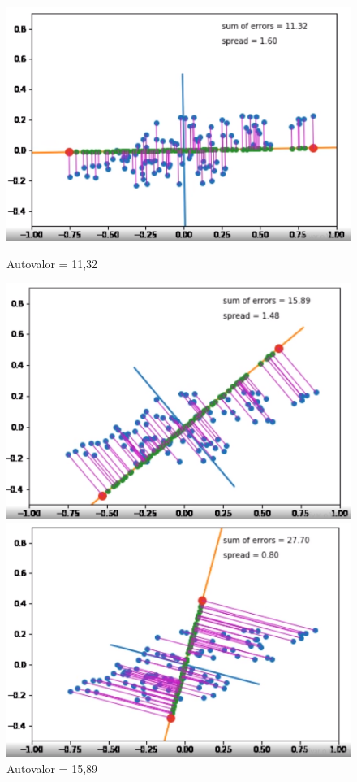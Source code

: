 \documentclass[12pt]{report}
\begin{document}
\begin{figure}
  \centering
  \begin{minipage}[b]{0.4\textwidth}
    \includegraphics[width=\textwidth]{images/1.png}
    \caption{Autovalor = 11,32}
  \end{minipage}
  \hfill
  \begin{minipage}[b]{0.4\textwidth}
    \includegraphics[width=\textwidth]{images/2.png}
    \caption{Autovalor = 15,89}
  \end{minipage}
    \hfill
  \begin{minipage}[b]{0.4\textwidth}
    \includegraphics[width=\textwidth]{images/3.png}

\end{minipage}
\end{figure}
\end{document}
